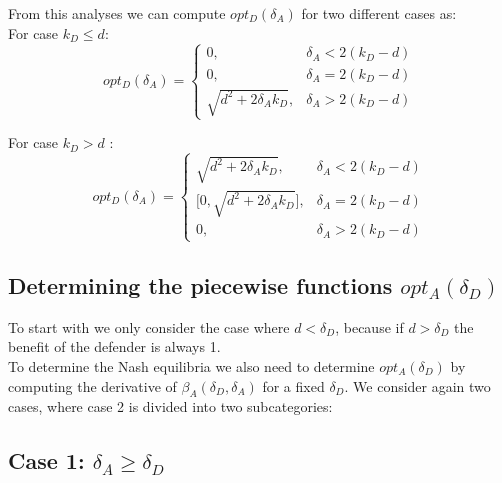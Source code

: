 From this analyses we can compute $opt_{D}(\delta_{A})$ for two different cases as: \\

For case  $k_{D} \leq d$:
 \begin{displaymath}
  opt_{D}(\delta_{A}) = \left\{
     \begin{array}{lr}
       0, & \delta_{A} < 2(k_{D} - d)\\
       0, & \delta_{A} = 2(k_{D} - d) \\
       \sqrt{d^{2} + 2\delta_{A}k_{D}}, & \delta_{A} > 2(k_{D} - d)
     \end{array}
   \right.
\end{displaymath}

For case $k_{D} > d$ :
 \begin{displaymath}
  opt_{D}(\delta_{A}) = \left\{
     \begin{array}{lr}
       \sqrt{d^{2} + 2\delta_{A}k_{D}}, & \delta_{A} < 2(k_{D} - d)\\
       \big[0,\sqrt{d^{2} + 2\delta_{A}k_{D}}\big], & \delta_{A} = 2(k_{D} - d) \\
       0, & \delta_{A} > 2(k_{D} - d)
     \end{array}
   \right.
\end{displaymath}


%
%
\subsection{Determining the piecewise functions $opt_{A}(\delta_{D})$}
To start with we only consider the case where $d < \delta_{D}$, because if $d > \delta_{D}$ the benefit of the defender  is always 1. \\
To determine the Nash equilibria we also need to determine $opt_{A}(\delta_{D})$ by computing the derivative of $\beta_{A}(\delta_{D},\delta_{A})$ for a fixed $\delta_{D}$. We consider again two cases, where case 2 is divided into two subcategories: \\

\subsection*{Case 1: $\delta_{A} \geq \delta_{D}$}

